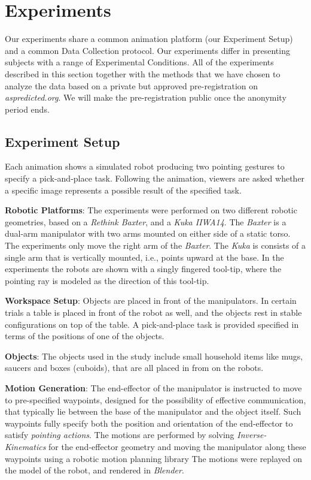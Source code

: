 \section{Experiments}
\label{experiments}


Our experiments share a common animation platform (our Experiment Setup) and a common Data Collection protocol.  Our experiments differ in presenting subjects with a range of Experimental Conditions.  All of the experiments described in this section together with the methods that we have chosen to analyze the data based on a private but approved pre-registration on \textit{aspredicted.org}. We will make the pre-registration public once the anonymity period ends.

\subsection{Experiment Setup}
Each animation shows a simulated robot producing two pointing gestures to specify a pick-and-place task.  Following the animation, viewers are asked whether a specific image represents a possible result of the specified task.

\noindent\textbf{Robotic Platforms}: The experiments were performed on two different robotic geometries, based on a \textit{Rethink Baxter}, and a \textit{Kuka IIWA14}.  The \textit{Baxter} is a dual-arm manipulator with two arms mounted on either side of a static torso. The experiments only move the right arm of the \textit{Baxter}. The \textit{Kuka} is consists of a single arm that is vertically mounted, i.e., points upward at the base. In the experiments the robots are shown with a singly fingered tool-tip, where the pointing ray is modeled as the direction of this tool-tip.

\noindent\textbf{Workspace Setup}: Objects are placed in front of the manipulators. In certain trials a table is placed in front of the robot as well, and the objects rest in stable configurations on top of the table. A pick-and-place task is provided specified in terms of the positions of one of the objects. 

\noindent\textbf{Objects}: The objects used in the study include small household items like mugs, saucers and boxes (cuboids), that are all placed in from on the robots.

\noindent\textbf{Motion Generation}: The end-effector of the manipulator is instructed to move to pre-specified waypoints, designed for the possibility of effective communication, that typically lie between the base of the manipulator and the object itself. Such waypoints fully specify both the position and orientation of the end-effector to satisfy \textit{pointing actions}. The motions are performed by solving \textit{Inverse-Kinematics} for the end-effector geometry and moving the manipulator along these waypoints using a robotic motion planning library 
The motions were replayed on the model of the robot, and rendered in \textit{Blender}.

